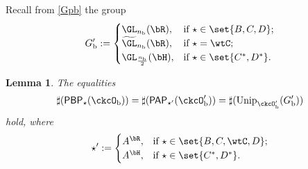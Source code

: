 \documentclass[12pt]{amsart}
\def\abs#1{\left|{#1}\right|}
\numberwithin{equation}{section}
\newtheorem{lem}[thm]{Lemma}
\theoremstyle{remark}
\def\half{{\tfrac{1}{2}}}
\def\Unip{\mathrm{Unip}}
\def\PP{\mathsf{PAP}}
\def\cupcol{{\stackrel{c}{\sqcup}}}
\def\PBP{\mathsf{PBP}}
\def\cupcol{{\,\stackrel{c}{\sqcup}\,}}
\def\ckcOb{\ckcO_{\mathrm b}}
\def\ckcOpb{\ckcO'_{\mathrm b}}
\def\Gpb{G'_{\mathrm b}}
\begin{document}



Recall from \eqref{Gpb} the group
\[
  G'_{\mathrm b} := \begin{cases}
    \GL_{n_{\mathrm b}}(\bR), & \text{if } \star \in \set{B,C,D}; \\
    \widetilde{\GL}_{n_{\mathrm b}}(\bR), & \text{if } \star = \wtC; \\
    \GL_{\frac{n_{\mathrm b}}{2}}(\bH), & \text{if } \star \in \set{C^{*},D^{*}}.\\
  \end{cases}
\]

\begin{lem}\label{prop:BP.PP} %
  The equalities
\[
    \begin{split}
      \sharp(\PBP_{\star}(\ckcO_{\mathrm b})) = \sharp(\PP_{\star '}(\ckcO'_{\mathrm b})) = \sharp(\Unip_{\ckcO'_{\mathrm b}}(G'_{\mathrm b}))
    \end{split}
  \]
  hold, where
\begin{equation}\label{def:star'}
\star ':= \begin{cases}
    A^{\bR}, & \text{if } \star \in \set{B,C,\wtC,D}; \\
    A^{\bH}, & \text{if } \star \in \set{C^{*},D^{*}}.\\
  \end{cases}
  \end{equation}
\end{lem}
\end{document}
